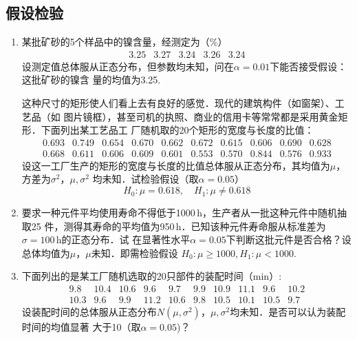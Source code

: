 \subsection{假设检验}

\begin{enumerate}


    \item 某批矿砂的5个样品中的镍含量，经测定为（\%）
    $$\begin{array}{ccccc}
        3.25 & 3.27 &  3.24 & 3.26 & 3.24
    \end{array}$$
    设测定值总体服从正态分布，但参数均未知，问在$\alpha=0.01$下能否接受假设：这批矿砂的镍含
    量的均值为3.25.


    这种尺寸的矩形使人们看上去有良好的感觉．现代的建筑构件（如窗架）、工艺品（如
    图片镜框），甚至司机的执照、商业的信用卡等常常都是采用黄金矩形．下面列出某工艺品工
    厂随机取的20个矩形的宽度与长度的比值：
    $$\begin{array}{cccccccccc}
        0.693 & 0.749 & 0.654 & 0.670 & 0.662  & 0.672 &  0.615 &  0.606 & 0.690 & 0.628\\
        0.668 & 0.611 & 0.606 & 0.609  & 0.601 & 0.553 & 0.570  & 0.844 &  0.576 &  0.933 
    \end{array}$$
    设这一工厂生产的矩形的宽度与长度的比值总体服从正态分布，其均值为$\mu$，方差为$\sigma^2$，$\mu,\sigma^2$
    均未知．试检验假设（取$\alpha=0.05$）
    $$H_0:\mu=0.618,\quad H_1:\mu\neq 0.618$$






    \item 要求一种元件平均使用寿命不得低于1000$\, \mathrm{h}$，生产者从一批这种元件中随机抽取25
    件，测得其寿命的平均值为950$\, \mathrm{h}$．已知该种元件寿命服从标准差为$\sigma=100\, \mathrm{h}$的正态分布．试
    在显著性水平$\alpha=0.05$下判断这批元件是否合格？设总体均值为$\mu$，$\mu$未知．即需检验假设
    $H_0:\mu\geq 1000,H_1:\mu<1000$.




    \item 下面列出的是某工厂随机选取的20只部件的装配时间（min）:
    $$\begin{array}{cccccccccc}
        9.8 &  10.4 &  10.6 &  9.6 &  9.7 &  9.9  & 10.9 &  11.1 &  9.6 &  10.2\\
        10.3 &  9.6 &  9.9 &  11.2 &  10.6 &  9.8  &  10.5 &  10.1 &  10.5 &  9.7
    \end{array}$$
    设装配时间的总体服从正态分布$N(\mu,\sigma^2)$，$\mu,\sigma^2$均未知．是否可以认为装配时间的均值显著
    大于10（取$\alpha=0.05$)？






\end{enumerate}
